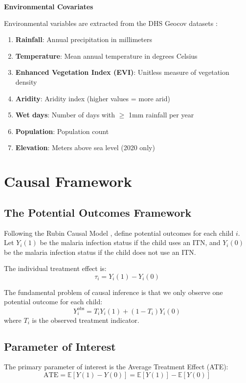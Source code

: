 \textbf{Environmental Covariates}

Environmental variables are extracted from the DHS Geocov datasets \citep{dhsgeocov}:

\begin{enumerate}
	\item \textbf{Rainfall}: Annual precipitation in millimeters
	\item \textbf{Temperature}: Mean annual temperature in degrees Celsius
	\item \textbf{Enhanced Vegetation Index (EVI)}: Unitless measure of vegetation density
	\item \textbf{Aridity}: Aridity index (higher values = more arid)
	\item \textbf{Wet days}: Number of days with $\geq$ 1mm rainfall per year
	\item \textbf{Population}: Population count
	\item \textbf{Elevation}: Meters above sea level (2020 only)
\end{enumerate}

\section{Causal Framework}

\subsection{The Potential Outcomes Framework}

Following the Rubin Causal Model \citep{rubin1974estimating}, define potential outcomes for each child $i$. Let $Y_i(1)$ be the malaria infection status if the child uses an ITN, and $Y_i(0)$ be the malaria infection status if the child does not use an ITN.

The individual treatment effect is:
\[
\tau_i = Y_i(1) - Y_i(0)
\]

The fundamental problem of causal inference is that we only observe one potential outcome for each child:
\[
Y_i^{\text{obs}} = T_i Y_i(1) + (1 - T_i) Y_i(0)
\]
where $T_i$ is the observed treatment indicator.

\subsection{Parameter of Interest}

The primary parameter of interest is the Average Treatment Effect (ATE):
\[
\text{ATE} = \mathbb{E}[Y(1) - Y(0)] = \mathbb{E}[Y(1)] - \mathbb{E}[Y(0)]
\]

